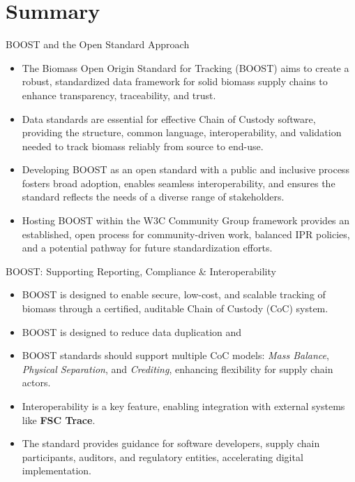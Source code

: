 \documentclass[presentation]{beamer}
\begin{document}
\section{Summary}
\label{summary-boost-and-the-open-standard-approach}
\begin{frame}[label={sec:org1891ef6}]{BOOST and the Open Standard Approach}
\begin{itemize}
\item The \alert{Biomass Open Origin Standard for Tracking (BOOST)} aims to create a robust, standardized data framework for solid biomass supply chains to enhance transparency, traceability, and trust.
\item \alert{Data standards are essential} for effective Chain of Custody software, providing the structure, common language, interoperability, and validation needed to track biomass reliably from source to end-use.
\item Developing BOOST as an \alert{open standard} with a public and inclusive process fosters broad adoption, enables seamless interoperability, and ensures the standard reflects the needs of a diverse range of stakeholders.
\item Hosting BOOST within the \alert{W3C Community Group} framework provides an established, open process for community-driven work, balanced IPR policies, and a potential pathway for future standardization efforts.
\end{itemize}
\end{frame}
\begin{frame}[label={sec:orgcocstandard}]{BOOST: Supporting Reporting, Compliance \& Interoperability}
\begin{itemize}
    \item BOOST is designed to enable \alert{secure, low-cost, and scalable} tracking of biomass through a certified, auditable Chain of Custody (CoC) system.
    \item BOOST is designed to reduce data duplication and 
    \item BOOST standards should support multiple CoC models: \textit{Mass Balance}, \textit{Physical Separation}, and \textit{Crediting}, enhancing flexibility for supply chain actors.
    \item Interoperability is a key feature, enabling integration with external systems like \textbf{FSC Trace}.
    \item The standard provides \alert{guidance for software developers, supply chain participants, auditors, and regulatory entities}, accelerating digital implementation.
\end{itemize}
\end{frame}
\end{document}
